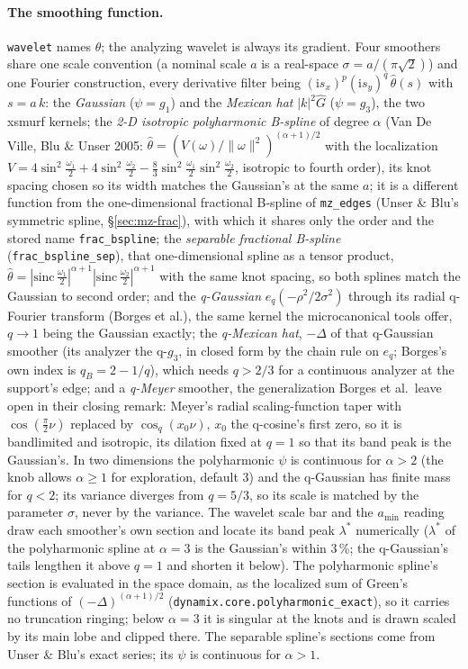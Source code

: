\documentclass[10pt]{article}
\newcommand{\dev}[1]{\texttt{#1}}
\begin{document}
\paragraph{The smoothing function.} \texttt{wavelet} names $\theta$; the analyzing wavelet
is always its gradient. Four smoothers share one scale convention (a nominal scale $a$ is a
real-space $\sigma=a/(\pi\sqrt2)$) and one Fourier construction, every derivative filter being
$(\mathrm{i}s_x)^p(\mathrm{i}s_y)^q\,\hat\theta(s)$ with $s=a\,k$: the \emph{Gaussian}
($\psi=g_1$) and the \emph{Mexican hat} $|k|^2\hat G$ ($\psi=g_3$), the two xsmurf kernels; the
\emph{2-D isotropic polyharmonic B-spline} of degree $\alpha$ (Van De
Ville, Blu \& Unser 2005: $\hat\theta=(V(\omega)/\|\omega\|^2)^{(\alpha+1)/2}$ with the
localization $V=4\sin^2\tfrac{\omega_1}{2}+4\sin^2\tfrac{\omega_2}{2}-\tfrac83\sin^2\tfrac{\omega_1}{2}\sin^2\tfrac{\omega_2}{2}$,
isotropic to fourth order), its knot spacing chosen so its width matches the Gaussian's at the
same $a$; it is a different function from the one-dimensional fractional B-spline of \dev{mz\_edges}
(Unser \& Blu's symmetric spline, \S\ref{sec:mz-frac}), with which it shares only the order and the
stored name \texttt{frac\_bspline}; the \emph{separable fractional B-spline}
(\texttt{frac\_bspline\_sep}), that one-dimensional spline as a tensor product,
$\hat\theta=|\mathrm{sinc}\,\tfrac{\omega_1}{2}|^{\alpha+1}|\mathrm{sinc}\,\tfrac{\omega_2}{2}|^{\alpha+1}$ with the same
knot spacing, so both splines match the Gaussian to second order; and
the \emph{q-Gaussian} $e_q(-\rho^2/2\sigma^2)$ through its radial q-Fourier transform
(Borges et al.), the same kernel the microcanonical tools offer, $q\to1$ being the Gaussian
exactly; the \emph{q-Mexican hat}, $-\Delta$ of that q-Gaussian smoother (its analyzer the
q-$g_3$, in closed form by the chain rule on $e_q$; Borges's own index is $q_B=2-1/q$), which
needs $q>2/3$ for a continuous analyzer at the support's edge; and a \emph{q-Meyer}
smoother, the generalization Borges et al.\ leave open in their closing remark: Meyer's
radial scaling-function taper with $\cos(\tfrac{\pi}{2}\nu)$ replaced by $\cos_q(x_0\nu)$,
$x_0$ the q-cosine's first zero, so it is bandlimited and isotropic, its dilation fixed at
$q=1$ so that its band peak is the Gaussian's. In two dimensions the polyharmonic $\psi$ is continuous for $\alpha>2$ (the knob allows
$\alpha\ge1$ for exploration, default 3) and the q-Gaussian has finite mass for $q<2$; its
variance diverges from $q=5/3$, so its scale is matched by the parameter $\sigma$, never by the
variance. The wavelet scale bar and the $a_{\min}$ reading draw each smoother's own section and
locate its band peak $\lambda^*$ numerically ($\lambda^*$ of the polyharmonic spline at $\alpha=3$
is the Gaussian's within 3\,\%; the q-Gaussian's tails lengthen it above $q=1$ and shorten it
below). The polyharmonic spline's section is evaluated in the space domain, as the localized sum
of Green's functions of $(-\Delta)^{(\alpha+1)/2}$ (\texttt{dynamix.core.polyharmonic\_exact}),
so it carries no truncation ringing; below $\alpha=3$ it is singular at the knots and is drawn
scaled by its main lobe and clipped there. The separable spline's sections come from Unser \& Blu's exact series;
its $\psi$ is continuous for $\alpha>1$.
\end{document}

